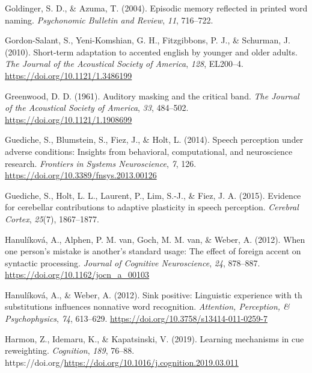\documentclass[
  11pt,
  english,
  man,floatsintext]{apa6}
\newlength{\cslhangindent}
\newlength{\cslentryspacingunit} %
\newenvironment{CSLReferences}[2] %
 {%
  \setlength{\parindent}{0pt}
  \ifodd #1
  \let\oldpar\par
  \def\par{\hangindent=\cslhangindent\oldpar}
  \fi
  \setlength{\parskip}{#2\cslentryspacingunit}
 }%
 {}
\begin{document}
\begin{CSLReferences}{1}{0}
\leavevmode{}%
Goldinger, S. D., \& Azuma, T. (2004). Episodic memory reflected in printed word naming. \emph{Psychonomic Bulletin and Review}, \emph{11}, 716--722.

\leavevmode{}%
Gordon-Salant, S., Yeni-Komshian, G. H., Fitzgibbons, P. J., \& Schurman, J. (2010). Short-term adaptation to accented english by younger and older adults. \emph{The Journal of the Acoustical Society of America}, \emph{128}, EL200--4. \url{https://doi.org/10.1121/1.3486199}

\leavevmode{}%
Greenwood, D. D. (1961). Auditory masking and the critical band. \emph{The Journal of the Acoustical Society of America}, \emph{33}, 484--502. \url{https://doi.org/10.1121/1.1908699}

\leavevmode{}%
Guediche, S., Blumstein, S., Fiez, J., \& Holt, L. (2014). Speech perception under adverse conditions: Insights from behavioral, computational, and neuroscience research. \emph{Frontiers in Systems Neuroscience}, \emph{7}, 126. \url{https://doi.org/10.3389/fnsys.2013.00126}

\leavevmode{}%
Guediche, S., Holt, L. L., Laurent, P., Lim, S.-J., \& Fiez, J. A. (2015). Evidence for cerebellar contributions to adaptive plasticity in speech perception. \emph{Cerebral Cortex}, \emph{25}(7), 1867--1877.

\leavevmode{}%
Hanulíková, A., Alphen, P. M. van, Goch, M. M. van, \& Weber, A. (2012). When one person's mistake is another's standard usage: The effect of foreign accent on syntactic processing. \emph{Journal of Cognitive Neuroscience}, \emph{24}, 878--887. \url{https://doi.org/10.1162/jocn_a_00103}

\leavevmode{}%
Hanulíková, A., \& Weber, A. (2012). Sink positive: Linguistic experience with th substitutions influences nonnative word recognition. \emph{Attention, Perception, \& Psychophysics}, \emph{74}, 613--629. \url{https://doi.org/10.3758/s13414-011-0259-7}

\leavevmode{}%
Harmon, Z., Idemaru, K., \& Kapatsinski, V. (2019). Learning mechanisms in cue reweighting. \emph{Cognition}, \emph{189}, 76--88. https://doi.org/\url{https://doi.org/10.1016/j.cognition.2019.03.011}


\end{CSLReferences}
\end{document}
